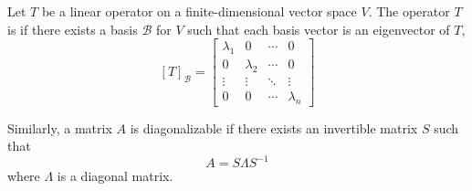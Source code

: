 \begin{definition}
Let $T$ be a linear operator on a finite-dimensional vector space $V$.
The operator $T$ is  if there exists a basis $\mathcal{B}$ for $V$ such that each basis vector is an eigenvector of $T$,
\begin{equation*}
\left[ T \right]_{\mathcal{B}}
= \begin{bmatrix}
\lambda_1 & 0 & \cdots & 0 \\
0 & \lambda_2 & \cdots & 0 \\
\vdots & \vdots & \ddots & \vdots \\
0 & 0 & \cdots & \lambda_n
\end{bmatrix}
\end{equation*}
\end{definition}

Similarly, a matrix $A$ is diagonalizable if there exists an invertible matrix $S$ such that
\begin{equation*}
A = S \Lambda S^{-1}
\end{equation*}
where $\Lambda$ is a diagonal matrix.

